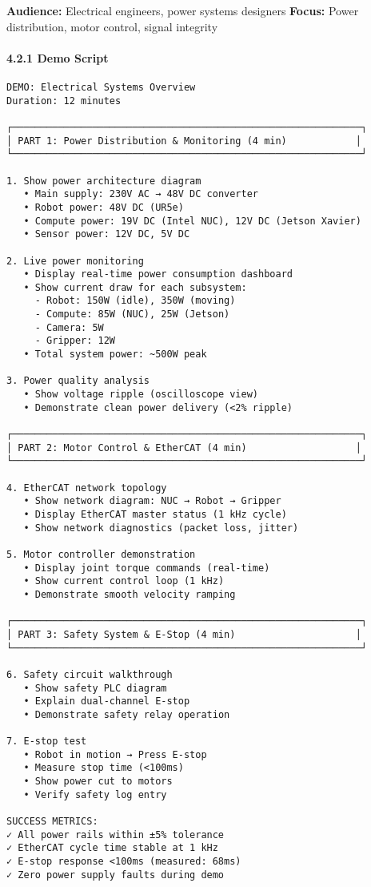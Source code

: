 \documentclass[
]{article}
\begin{document}
\textbf{Audience:} Electrical engineers, power systems designers
\textbf{Focus:} Power distribution, motor control, signal integrity

\hypertarget{demo-script-1}{%
\paragraph{4.2.1 Demo Script}\label{demo-script-1}}

\begin{verbatim}
DEMO: Electrical Systems Overview
Duration: 12 minutes

┌─────────────────────────────────────────────────────────────┐
│ PART 1: Power Distribution & Monitoring (4 min)            │
└─────────────────────────────────────────────────────────────┘

1. Show power architecture diagram
   • Main supply: 230V AC → 48V DC converter
   • Robot power: 48V DC (UR5e)
   • Compute power: 19V DC (Intel NUC), 12V DC (Jetson Xavier)
   • Sensor power: 12V DC, 5V DC

2. Live power monitoring
   • Display real-time power consumption dashboard
   • Show current draw for each subsystem:
     - Robot: 150W (idle), 350W (moving)
     - Compute: 85W (NUC), 25W (Jetson)
     - Camera: 5W
     - Gripper: 12W
   • Total system power: ~500W peak

3. Power quality analysis
   • Show voltage ripple (oscilloscope view)
   • Demonstrate clean power delivery (<2% ripple)

┌─────────────────────────────────────────────────────────────┐
│ PART 2: Motor Control & EtherCAT (4 min)                   │
└─────────────────────────────────────────────────────────────┘

4. EtherCAT network topology
   • Show network diagram: NUC → Robot → Gripper
   • Display EtherCAT master status (1 kHz cycle)
   • Show network diagnostics (packet loss, jitter)

5. Motor controller demonstration
   • Display joint torque commands (real-time)
   • Show current control loop (1 kHz)
   • Demonstrate smooth velocity ramping

┌─────────────────────────────────────────────────────────────┐
│ PART 3: Safety System & E-Stop (4 min)                     │
└─────────────────────────────────────────────────────────────┘

6. Safety circuit walkthrough
   • Show safety PLC diagram
   • Explain dual-channel E-stop
   • Demonstrate safety relay operation

7. E-stop test
   • Robot in motion → Press E-stop
   • Measure stop time (<100ms)
   • Show power cut to motors
   • Verify safety log entry

SUCCESS METRICS:
✓ All power rails within ±5% tolerance
✓ EtherCAT cycle time stable at 1 kHz
✓ E-stop response <100ms (measured: 68ms)
✓ Zero power supply faults during demo
\end{verbatim}
\end{document}
